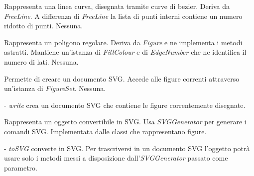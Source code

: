Rappresenta una linea curva, disegnata tramite curve di bezier.
Deriva da \textit{FreeLine}. A differenza di \textit{FreeLine} la lista di punti interni contiene un numero ridotto di punti.
Nessuna.

Rappresenta un poligono regolare.
Deriva da \textit{Figure} e ne implementa i metodi astratti. Mantiene un'istanza di \textit{FillColour} e di \textit{EdgeNumber} che ne identifica il numero di lati.
Nessuna.

Permette di creare un documento SVG.
Accede alle figure correnti attraverso un'istanza di \textit{FigureSet}.
Nessuna.
\begin{elencopuntato}[\normindent]
\item[-] \textit{write} crea un documento SVG che contiene le figure correntemente disegnate.
\end{elencopuntato}

Rappresenta un oggetto convertibile in SVG.
Usa \textit{SVGGenerator} per generare i comandi SVG.
Implementata dalle classi che rappresentano figure.
\begin{elencopuntato}[\normindent]
\item[-] \textit{toSVG} converte in SVG. Per trascriversi in un documento SVG l'oggetto potr\`a usare solo i metodi messi a disposizione dall'\textit{SVGGenerator} passato come parametro.
\end{elencopuntato}

